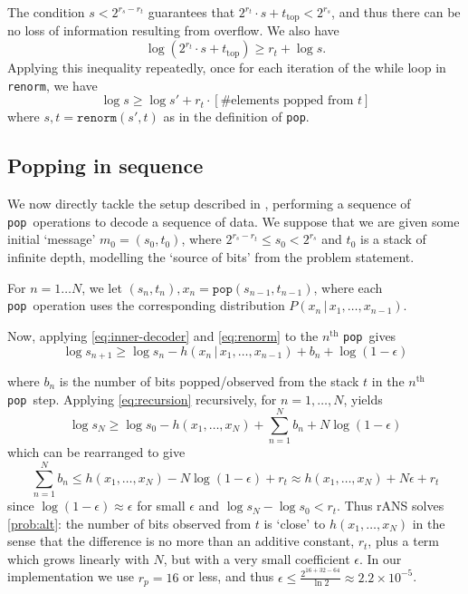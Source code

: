 \documentclass{article}
\newcommand\given{\,\vert\,}
\newcommand{\pop}{\texttt{pop}}
\begin{document}
The condition $s < 2^{r_s - r_t}$ guarantees that $2^{r_t} \cdot s +
t_{\text{top}} < 2^{r_s}$, and thus there can be no loss of information
resulting from overflow. We also have
\begin{equation}
  \log (2^{r_t} \cdot s + t_\text{top}) \geq r_t + \log s.
\end{equation}
Applying this inequality repeatedly, once for each iteration of the while loop
in \texttt{renorm}, we have
\begin{equation}\label{eq:renorm}
\log s \geq \log s' + r_t\cdot\left[\text{\# elements popped from $t$}\right]
\end{equation}
where $s, t = \texttt{renorm}(s', t)$ as in the definition of \pop.

\subsection*{Popping in sequence}
We now directly tackle the setup described in , performing a
sequence of \pop\ operations to decode a sequence of data. We suppose that we
are given some initial `message' $m_0= (s_0, t_0)$, where $2^{r_s - r_t} \leq
s_0 < 2^{r_s}$ and $t_0$ is a stack of infinite depth, modelling the `source of
bits' from the problem statement.

For $n=1\ldots N$, we let $(s_n, t_n), x_n = \pop(s_{n-1}, t_{n-1})$, where
each \pop\ operation uses the corresponding distribution $P(x_n\given
x_1,\ldots,x_{n-1})$.

Now, applying \cref{eq:inner-decoder} and \cref{eq:renorm} to the
$n^\mathrm{th}$ \pop\ gives
\begin{equation}\label{eq:recursion}
  \log s_{n+1} \geq \log s_n - h(x_n\given x_1,\ldots,x_{n-1}) + b_n + \log (1
  - \epsilon)
\end{equation}

where $b_n$ is the number of bits popped/observed from the stack $t$ in the
$n^{\mathrm{th}}$ \pop\ step. Applying \cref{eq:recursion} recursively, for
$n=1,\ldots, N$, yields
\begin{equation}
  \log s_N \geq \log s_0 - h(x_1, \ldots, x_N) + \sum_{n=1}^{N} b_n +
  N\log(1-\epsilon)
\end{equation}
which can be rearranged to give
\begin{equation}
  \sum_{n=1}^Nb_n \leq h(x_1, \ldots, x_N) - N\log(1-\epsilon) + r_t
  \approx h(x_1, \ldots, x_N) + N\epsilon + r_t
\end{equation}
since $\log(1 - \epsilon)\approx\epsilon$ for small $\epsilon$ and $\log s_N -
\log s_0 < r_t$. Thus rANS solves \cref{prob:alt}: the number of bits observed
from $t$ is `close' to $h(x_1,\ldots,x_N)$ in the sense that the difference is
no more than an additive constant, $r_t$, plus a term which grows linearly with
$N$, but with a very small coefficient $\epsilon$. In our implementation we use
$r_p = 16$ or less, and thus $\epsilon \leq \frac{2^{16 + 32 - 64}}{\ln 2}
\approx 2.2\times 10^{-5}$.
\end{document}
